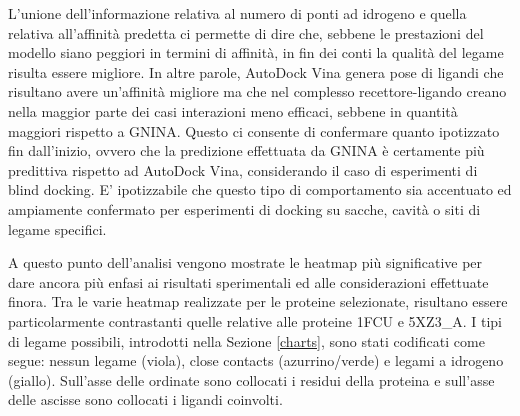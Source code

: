 L'unione dell'informazione relativa al numero di ponti ad idrogeno e quella relativa all'affinità predetta ci permette di dire che, sebbene le prestazioni del modello siano peggiori in termini di affinità, in fin dei conti la qualità del legame risulta essere migliore. In altre parole, AutoDock Vina genera pose di ligandi che risultano avere un'affinità migliore ma che nel complesso recettore-ligando creano nella maggior parte dei casi interazioni meno efficaci, sebbene in quantità maggiori rispetto a GNINA. 
Questo ci consente di confermare quanto ipotizzato fin dall'inizio, ovvero che la predizione effettuata da GNINA è certamente più predittiva rispetto ad AutoDock Vina, considerando il caso di esperimenti di blind docking.
E' ipotizzabile che questo tipo di comportamento sia accentuato ed ampiamente confermato per esperimenti di docking su sacche, cavità o siti di legame specifici.

A questo punto dell'analisi vengono mostrate le heatmap più significative per dare ancora più enfasi ai risultati sperimentali ed alle considerazioni effettuate finora. Tra le varie heatmap realizzate per le proteine selezionate, risultano essere particolarmente contrastanti quelle relative alle proteine 1FCU e 5XZ3\_A. 
I tipi di legame possibili, introdotti nella Sezione \ref{charts}, sono stati codificati come segue: nessun legame (viola), close contacts (azurrino/verde) e legami a idrogeno (giallo). Sull'asse delle ordinate sono collocati i residui della proteina e sull'asse delle ascisse sono collocati i ligandi coinvolti.  


